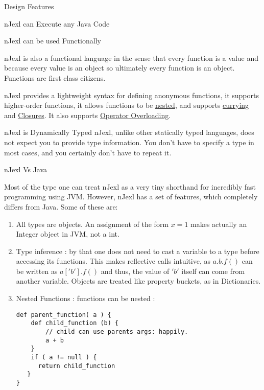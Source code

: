 \begin{section}{Design Features}
\begin{subsection}{nJexl can Execute any Java Code}
\end{subsection}


\begin{subsection}{nJexl can be used Functionally}

nJexl is also a functional language in the sense that every function is a value and because every value is an object so ultimately every function is an object. Functions are first class citizens.

nJexl provides a lightweight syntax for defining anonymous functions, it supports higher-order functions, it allows functions to be 
\href{https://en.wikipedia.org/wiki/Nested_function}{nested}, and supports \href{https://en.wikipedia.org/wiki/Currying}{currying} and \href{https://en.wikipedia.org/wiki/Closure_(computer_programming)}{Closures}. 
It also supports \href{https://en.wikipedia.org/wiki/Operator_overloading}{Operator Overloading}. 

\end{subsection}

\begin{subsection}{nJexl is Dynamically Typed}
nJexl, unlike other statically typed languages, does not expect you to provide type information. 
You don't have to specify a type in most cases, and you certainly don't have to repeat it.

\end{subsection}

\begin{subsection}{nJexl Vs Java}

Most of the type one can treat nJexl as a very tiny shorthand for incredibly fast programming using JVM.
However, nJexl has a set of features, which completely differs from Java. Some of these are:

\begin{enumerate}

\item{ All types are objects. An assignment of the form $x = 1 $ makes actually an Integer object in JVM, not a int. }

\item { Type inference :  by that one does not need to cast a variable to a type before accessing its functions. 
    This makes reflective calls intuitive, as $ a.b.f() $ can be written as $ a['b'].f() $ and thus, the value of $'b'$
    itself can come from another variable. Objects are treated like property buckets, as in Dictionaries.  
}

\item { Nested Functions : functions can be nested :
\begin{lstlisting}[style=JexlStyle]
def parent_function( a ) {
    def child_function (b) {
        // child can use parents args: happily.
    	a + b 
    }
    if ( a != null ) {
      return child_function 
   }
}
\end{lstlisting}
}


\end{enumerate}
\end{subsection}
\end{section}
